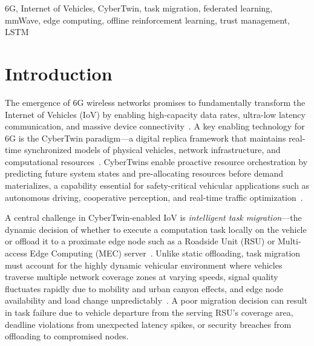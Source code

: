 \documentclass[journal,twoside]{IEEEtran}
\begin{document}
\begin{IEEEkeywords}
6G, Internet of Vehicles, CyberTwin, task migration, federated learning, mmWave, edge computing, offline reinforcement learning, trust management, LSTM
\end{IEEEkeywords}


\section{Introduction}
\label{sec:introduction}

The emergence of 6G wireless networks promises to fundamentally transform the Internet of Vehicles (IoV) by enabling high-capacity data rates, ultra-low latency communication, and massive device connectivity~\cite{zhang20206g, wu2020comprehensive}. A key enabling technology for 6G is the CyberTwin paradigm---a digital replica framework that maintains real-time synchronized models of physical vehicles, network infrastructure, and computational resources~\cite{liang2022cybertwin, hu2023cybertwin}. CyberTwins enable proactive resource orchestration by predicting future system states and pre-allocating resources before demand materializes, a capability essential for safety-critical vehicular applications such as autonomous driving, cooperative perception, and real-time traffic optimization~\cite{dai2021survey, zhang2022cybertwin}.

A central challenge in CyberTwin-enabled IoV is \emph{intelligent task migration}---the dynamic decision of whether to execute a computation task locally on the vehicle or offload it to a proximate edge node such as a Roadside Unit (RSU) or Multi-access Edge Computing (MEC) server~\cite{mach2019mobile, huang2021computation}. Unlike static offloading, task migration must account for the highly dynamic vehicular environment where vehicles traverse multiple network coverage zones at varying speeds, signal quality fluctuates rapidly due to mobility and urban canyon effects, and edge node availability and load change unpredictably~\cite{zhang2020mobile, abbas2020mobile}. A poor migration decision can result in task failure due to vehicle departure from the serving RSU's coverage area, deadline violations from unexpected latency spikes, or security breaches from offloading to compromised nodes.
\end{document}
